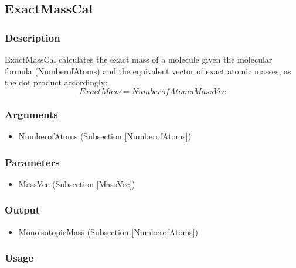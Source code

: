 \subsection{ExactMassCal}\label{ExactMassCal}
\subsubsection{Description}
ExactMassCal calculates the exact mass of a molecule given the molecular formula (NumberofAtoms) and the equivalent vector of exact atomic masses, as the dot product accordingly:
\begin{equation}
ExactMass={NumberofAtoms}{MassVec}
\end{equation}

\subsubsection{Arguments}
\begin{itemize}
\item NumberofAtoms (Subsection \ref{NumberofAtoms})
\end{itemize}

\subsubsection{Parameters}
\begin{itemize}
\item MassVec (Subsection \ref{MassVec})
\end{itemize}

\subsubsection{Output}
\begin{itemize}
\item MonoisotopicMass (Subsection \ref{NumberofAtoms})
\end{itemize}

\subsubsection{Usage}




